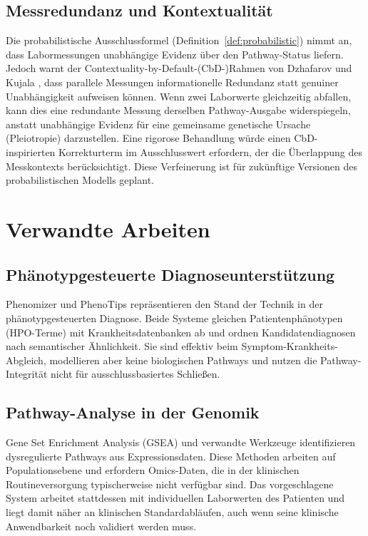 \documentclass[12pt,a4paper]{article}
\begin{document}
\subsection{Messredundanz und Kontextualität}

Die probabilistische Ausschlussformel (Definition~\ref{def:probabilistic}) nimmt an, dass Labormessungen unabhängige Evidenz über den Pathway-Status liefern. Jedoch warnt der Contextuality-by-Default-(CbD-)Rahmen von Dzhafarov und Kujala \citep{Dzhafarov2016}, dass parallele Messungen informationelle Redundanz statt genuiner Unabhängigkeit aufweisen können. Wenn zwei Laborwerte gleichzeitig abfallen, kann dies eine redundante Messung derselben Pathway-Ausgabe widerspiegeln, anstatt unabhängige Evidenz für eine gemeinsame genetische Ursache (Pleiotropie) darzustellen. Eine rigorose Behandlung würde einen CbD-inspirierten Korrekturterm im Ausschlusswert erfordern, der die Überlappung des Messkontexts berücksichtigt. Diese Verfeinerung ist für zukünftige Versionen des probabilistischen Modells geplant.

\section{Verwandte Arbeiten}
\label{sec:related}

\subsection{Phänotypgesteuerte Diagnoseunterstützung}

Phenomizer \citep{Kohler2009} und PhenoTips \citep{Girdea2013} repräsentieren den Stand der Technik in der phänotypgesteuerten Diagnose. Beide Systeme gleichen Patientenphänotypen (HPO-Terme) mit Krankheitsdatenbanken ab und ordnen Kandidatendiagnosen nach semantischer Ähnlichkeit. Sie sind effektiv beim Symptom-Krankheits-Abgleich, modellieren aber keine biologischen Pathways und nutzen die Pathway-Integrität nicht für ausschlussbasiertes Schließen.

\subsection{Pathway-Analyse in der Genomik}

Gene Set Enrichment Analysis (GSEA) \citep{Subramanian2005} und verwandte Werkzeuge identifizieren dysregulierte Pathways aus Expressionsdaten. Diese Methoden arbeiten auf Populationsebene und erfordern Omics-Daten, die in der klinischen Routineversorgung typischerweise nicht verfügbar sind. Das vorgeschlagene System arbeitet stattdessen mit individuellen Laborwerten des Patienten und liegt damit näher an klinischen Standardabläufen, auch wenn seine klinische Anwendbarkeit noch validiert werden muss.
\end{document}
